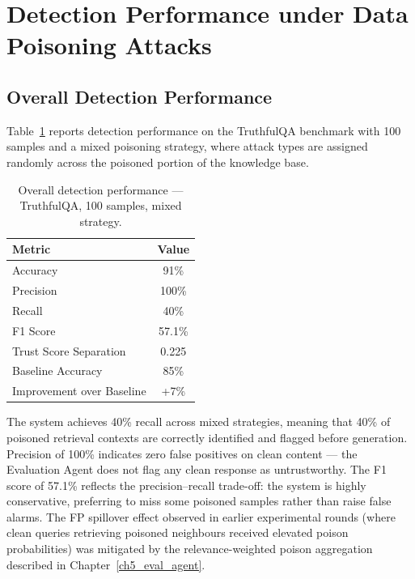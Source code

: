 \section{Detection Performance under Data Poisoning Attacks}
\label{sec:ch6_detection}

\subsection{Overall Detection Performance}

Table~\ref{tab:main_results} reports detection performance on the TruthfulQA benchmark
with 100 samples and a mixed poisoning strategy, where attack types are assigned randomly
across the poisoned portion of the knowledge base.

\begin{table}[h]
\centering
\caption{Overall detection performance --- TruthfulQA, 100 samples, mixed strategy.}
\label{tab:main_results}
\begin{tabular}{lc}
\hline
\textbf{Metric} & \textbf{Value} \\
\hline
Accuracy                  & 91\%   \\
Precision                 & 100\%  \\
Recall                    & 40\%   \\
F1 Score                  & 57.1\% \\
Trust Score Separation    & 0.225  \\
Baseline Accuracy         & 85\%   \\
Improvement over Baseline & +7\%   \\
\hline
\end{tabular}
\end{table}

The system achieves 40\% recall across mixed strategies, meaning that 40\% of poisoned
retrieval contexts are correctly identified and flagged before generation. Precision of
100\% indicates zero false positives on clean content --- the Evaluation Agent does not
flag any clean response as untrustworthy. The F1 score of 57.1\% reflects the
precision--recall trade-off: the system is highly conservative, preferring to miss some
poisoned samples rather than raise false alarms. The FP spillover effect observed in
earlier experimental rounds (where clean queries retrieving poisoned neighbours received
elevated poison probabilities) was mitigated by the relevance-weighted poison aggregation
described in Chapter~\ref{ch5_eval_agent}.

